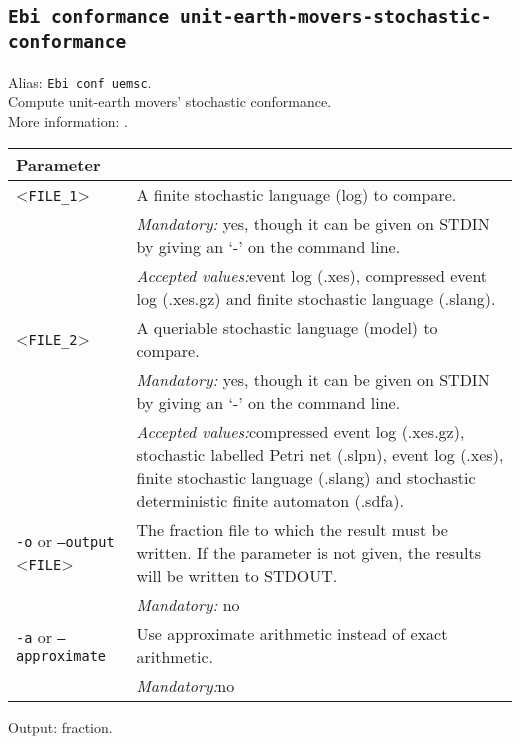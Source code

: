 {\subsection{\texttt{Ebi conformance unit-earth-movers-stochastic-conformance}}
\label{command:Ebi conformance unit-earth-movers-stochastic-conformance}
Alias: \texttt{Ebi conf uemsc}.\\
Compute unit-earth movers' stochastic conformance.\\
More information: \cite{DBLP:conf/bpm/LeemansSA19}.\\
\begin{tabularx}{\linewidth}{lX}
\toprule
Parameter \\\midrule
<\texttt{FILE\_1}>&A finite stochastic language (log) to compare.\\
&\textit{Mandatory:} \quad yes, though it can be given on STDIN by giving an `-' on the command line.\\
&\textit{Accepted values:}\quad event log (.xes), compressed event log (.xes.gz) and finite stochastic language (.slang).\\
<\texttt{FILE\_2}>&A queriable stochastic language (model) to compare.\\
&\textit{Mandatory:} \quad yes, though it can be given on STDIN by giving an `-' on the command line.\\
&\textit{Accepted values:}\quad compressed event log (.xes.gz), stochastic labelled Petri net (.slpn), event log (.xes), finite stochastic language (.slang) and stochastic deterministic finite automaton (.sdfa).\\
\texttt{-o} or \texttt{--output} <\texttt{FILE}> &
The fraction file to which the result must be written. If the parameter is not given, the results will be written to STDOUT.\\
&\textit{Mandatory:} \quad no\\
\texttt{-a} or \texttt{--approximate} & Use approximate arithmetic instead of exact arithmetic.\\
&\textit{Mandatory:}\quad no\\
\bottomrule
\end{tabularx}
Output: fraction.
}
